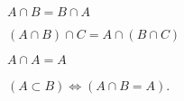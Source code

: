 \begin{proposition}[Commutativity]
$A \cap B = B \cap A$
\end{proposition}

\begin{proposition}[Associativity]
$(A \cap  B) \cap  C = A \cap  (B \cap  C)$
\end{proposition}

\begin{proposition}
$A \cap  A = A$
\end{proposition}

\begin{proposition}
$(A \subset B) \iff (A \cap B = A)$.
\end{proposition}

